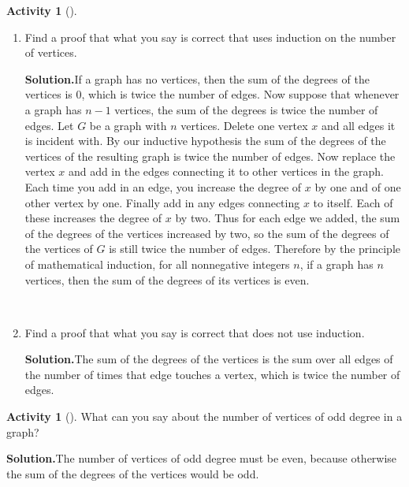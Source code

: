 \documentclass[10pt,]{book}
\theoremstyle{plain}
\theoremstyle{definition}
\newtheorem{activity}[project]{Activity}
\numberwithin{equation}{chapter}
\begin{document}
\begin{activity}[]
\begin{enumerate}[label=(\alph*)]
~\par
\item Find a proof that what you say is correct that uses induction on the number of vertices.%
\par\medskip\noindent%
\textbf{Solution.}\quad If a graph has no vertices, then the sum of the degrees of the vertices is 0, which is twice the number of edges. Now suppose that whenever a graph has \(n-1\) vertices, the sum of the degrees is twice the number of edges. Let \(G\) be a graph with \(n\) vertices. Delete one vertex \(x\) and all edges it is incident with. By our inductive hypothesis the sum of the degrees of the vertices of the resulting graph is twice the number of edges. Now replace the vertex \(x\) and add in the edges connecting it to other vertices in the graph. Each time you add in an edge, you increase the degree of \(x\) by one and of one other vertex by one. Finally add in any edges connecting \(x\) to itself. Each of these increases the degree of \(x\) by two. Thus for each edge we added, the sum of the degrees of the vertices increased by two, so the sum of the degrees of the vertices of \(G\) is still twice the number of edges. Therefore by the principle of mathematical induction, for all nonnegative integers \(n\), if a graph has \(n\) vertices, then the sum of the degrees of its vertices is even.%

~\par
\item Find a proof that what you say is correct that does not use induction.%
\par\medskip\noindent%
\textbf{Solution.}\quad The sum of the degrees of the vertices is the sum over all edges of the number of times that edge touches a vertex, which is twice the number of edges.%

\end{enumerate}
\end{activity}
\begin{activity}[]\label{activity-48}
What can you say about the number of vertices of odd degree in a graph?%
\par\medskip\noindent%
\textbf{Solution.}\quad The number of vertices of odd degree must be even, because otherwise the sum of the degrees of the vertices would be odd.%
\end{activity}
\typeout{************************************************}
\typeout{************************************************}
\end{document}
